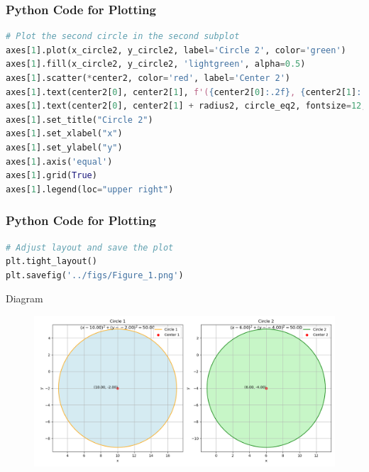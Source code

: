 \documentclass{beamer}
\begin{document}
\begin{frame}[fragile]
\frametitle{Python Code for Plotting}
\begin{lstlisting}[language=Python]
# Plot the second circle in the second subplot
axes[1].plot(x_circle2, y_circle2, label='Circle 2', color='green')
axes[1].fill(x_circle2, y_circle2, 'lightgreen', alpha=0.5)
axes[1].scatter(*center2, color='red', label='Center 2')
axes[1].text(center2[0], center2[1], f'({center2[0]:.2f}, {center2[1]:.2f})', fontsize=10, ha='right')
axes[1].text(center2[0], center2[1] + radius2, circle_eq2, fontsize=12, ha='center', color='black')
axes[1].set_title("Circle 2")
axes[1].set_xlabel("x")
axes[1].set_ylabel("y")
axes[1].axis('equal')
axes[1].grid(True)
axes[1].legend(loc="upper right")
\end{lstlisting}
\end{frame}
\begin{frame}[fragile]
\frametitle{Python Code for Plotting}
\begin{lstlisting}[language=Python]
# Adjust layout and save the plot
plt.tight_layout()
plt.savefig('../figs/Figure_1.png')
\end{lstlisting}
\end{frame}
\begin{frame}{Diagram}
\begin{figure}[!ht]
    \centering
    \includegraphics[width=\linewidth]{figs/Figure_1.png}
    
\end{figure}
    
\end{frame}
\end{document}
